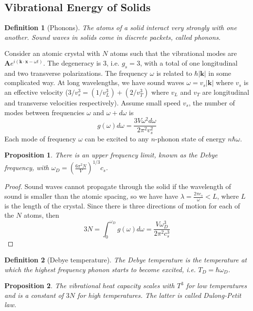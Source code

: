 \documentclass[a4paper]{article}
\theoremstyle{new}
\newtheorem{defi}{Definition}[section]
\newtheorem{prop}{Proposition}[section]
\begin{document}
\subsection{Vibrational Energy of Solids}
\begin{defi}[Phonons]
The atoms of a solid interact very strongly with one another. Sound waves in solids come in discrete packets, called phonons.
\end{defi}
Consider an atomic crystal with $N$ atoms such that the vibrational modes are $\mathbf{A}e^{i(\mathbf{k}\cdot\mathbf{x}-\omega t)}$. The degeneracy is 3, i.e. $g_s=3$, with a total of one longitudinal and two transverse polarizations. The frequency $\omega$ is related to $\hbar|\mathbf{k}|$ in some complicated way. At long wavelengths, we have sound waves $\omega=v_s|\mathbf{k}|$ where $v_s$ is an effective velocity ($3/v_s^3=(1/v_L^3)+(2/v_T^3)$ where $v_L$ and $v_T$ are longitudinal and transverse velocities respectively).  Assume small speed $v_s$, the number of modes between frequencies $\omega$ and $\omega+d\omega$ is
$$g(\omega)d\omega=\frac{3V\omega^2d\omega}{2\pi^2v_s^2}$$
Each mode of frequency $\omega$ can be excited to any $n$-phonon state of energy $n\hbar\omega$. 
\begin{prop}
There is an upper frequency limit, known as the Debye frequency, with $\omega_D=(\frac{6\pi^2N}{V})^{1/3}c_s$.
\end{prop}
\begin{proof}
Sound waves cannot propagate through the solid if the wavelength of sound is smaller than the atomic spacing, so we have have $\lambda=\frac{2\pi c_s}{\omega}<L$, where $L$ is the length of the crystal. Since there is three directions of motion for each of the $N$ atoms, then 
$$3N=\int_0^{\omega_D}g(\omega)d\omega=\frac{V\omega_D^3}{2\pi^2c_s^3}$$
\end{proof}
\begin{defi}[Debye temperature]
The Debye temperature is the temperature at which the highest frequency phonon starts to become excited, i.e. $T_D=\hbar\omega_D$.
\end{defi}
\begin{prop}
The vibrational heat capacity scales with $T^3$ for low temperatures and is a constant of $3N$ for high temperatures. The latter is called Dulong-Petit law.
\end{prop}
\end{document}
